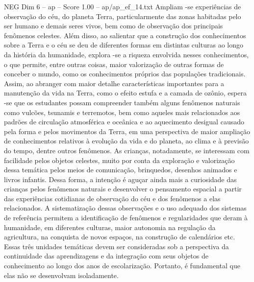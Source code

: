 \begin{textsample}{NEG Dim 6 – ap – Score 1.00 – ap/ap\_ef\_14.txt}
Ampliam -se experiências de observação do céu, do planeta Terra, particularmente das zonas habitadas pelo ser humano e demais seres vivos, bem como de observação dos principais fenômenos celestes.
Além disso, ao salientar que a construção dos conhecimentos sobre a Terra e o céu se deu de diferentes formas em distintas culturas ao longo da história da humanidade, explora -se a riqueza envolvida nesses conhecimentos, o que permite, entre outras coisas, maior valorização de outras formas de conceber o mundo, como os conhecimentos próprios das populações tradicionais.
Assim, ao abranger com maior detalhe características importantes para a manutenção da vida na Terra, como o efeito estufa e a camada de ozônio, espera -se que os estudantes possam compreender também alguns fenômenos naturais como vulcões, tsunamis e terremotos, bem como aqueles mais relacionados aos padrões de circulação atmosférica e oceânica e ao aquecimento desigual causado pela forma e pelos movimentos da Terra, em uma perspectiva de maior ampliação de conhecimentos relativos à evolução da vida e do planeta, ao clima e à previsão do tempo, dentre outros fenômenos.
As crianças, notadamente, se interessam com facilidade pelos objetos celestes, muito por conta da exploração e valorização dessa temática pelos meios de comunicação, brinquedos, desenhos animados e livros infantis.
Dessa forma, a intenção é aguçar ainda mais a curiosidade das crianças pelos fenômenos naturais e desenvolver o pensamento espacial a partir das experiências cotidianas de observação do céu e dos fenômenos a elas relacionados.
A sistematização dessas observações e o uso adequado dos sistemas de referência permitem a identificação de fenômenos e regularidades que deram à humanidade, em diferentes culturas, maior autonomia na regulação da agricultura, na conquista de novos espaços, na construção de calendários etc.
Essas três unidades temáticas devem ser consideradas sob a perspectiva da continuidade das aprendizagens e da integração com seus objetos de conhecimento ao longo dos anos de escolarização.
Portanto, é fundamental que elas não se desenvolvam isoladamente.

\end{textsample}
